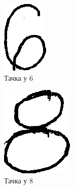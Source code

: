 \begin{figure}[htb!]\caption{Правилна класификација}
\begin{subfigure}{.3\textwidth}
\centering
\includegraphics[width=.4\linewidth]{pictures/1/GoodClass6}
\caption{Тачка у 6}\label{pic:goodClass6}
\end{subfigure}
\begin{subfigure}{.3\textwidth}
\centering
\includegraphics[width=.4\linewidth]{pictures/1/GoodClass8}
\caption{Тачка у 8}\label{pic:goodClass8}
\end{subfigure}
\begin{subfigure}{.3\textwidth}
\centering

\end{subfigure}
\end{figure}
